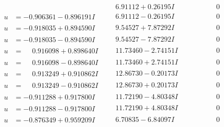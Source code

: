 \documentclass[1p]{elsarticle_modified}
\theoremstyle{definition}
\begin{document}
$$\begin{array}{c|c|c}
 & \phantom{-}6.91112 + 0.26195 I & \phantom{-0.000000 } 0 \\ \hline\begin{aligned}
u &= -0.906361 - 0.896191 I\end{aligned}
 & \phantom{-}6.91112 - 0.26195 I & \phantom{-0.000000 } 0 \\ \hline\begin{aligned}
u &= -0.918035 + 0.894590 I\end{aligned}
 & \phantom{-}9.54527 + 7.87292 I & \phantom{-0.000000 } 0 \\ \hline\begin{aligned}
u &= -0.918035 - 0.894590 I\end{aligned}
 & \phantom{-}9.54527 - 7.87292 I & \phantom{-0.000000 } 0 \\ \hline\begin{aligned}
u &= \phantom{-}0.916098 + 0.898640 I\end{aligned}
 & \phantom{-}11.73460 - 2.74151 I & \phantom{-0.000000 } 0 \\ \hline\begin{aligned}
u &= \phantom{-}0.916098 - 0.898640 I\end{aligned}
 & \phantom{-}11.73460 + 2.74151 I & \phantom{-0.000000 } 0 \\ \hline\begin{aligned}
u &= \phantom{-}0.913249 + 0.910862 I\end{aligned}
 & \phantom{-}12.86730 - 0.20173 I & \phantom{-0.000000 } 0 \\ \hline\begin{aligned}
u &= \phantom{-}0.913249 - 0.910862 I\end{aligned}
 & \phantom{-}12.86730 + 0.20173 I & \phantom{-0.000000 } 0 \\ \hline\begin{aligned}
u &= -0.911288 + 0.917800 I\end{aligned}
 & \phantom{-}11.72190 - 4.80348 I & \phantom{-0.000000 } 0 \\ \hline\begin{aligned}
u &= -0.911288 - 0.917800 I\end{aligned}
 & \phantom{-}11.72190 + 4.80348 I & \phantom{-0.000000 } 0 \\ \hline\begin{aligned}
u &= -0.876349 + 0.959209 I\end{aligned}
 & \phantom{-}6.70835 - 6.84097 I & \phantom{-0.000000 } 0 \\ \hline\begin{aligned}

\end{aligned}
\end{array}$$
\end{document}
